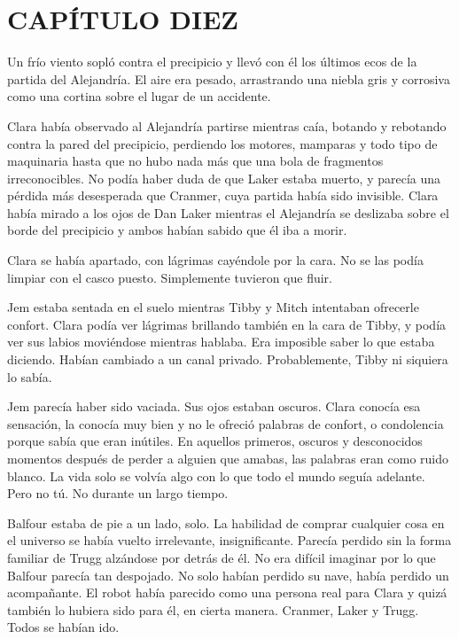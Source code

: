 \chapter*{CAPÍTULO DIEZ}

{Un frío viento sopló contra el precipicio y llevó con él los últimos
 ecos de la partida del Alejandría. El aire era pesado, arrastrando una
 niebla gris y corrosiva como una cortina sobre el lugar de un
accidente.}

{Clara había observado al Alejandría partirse mientras caía, botando y
 rebotando contra la pared del precipicio, perdiendo los motores,
 mamparas y todo tipo de maquinaria hasta que no hubo nada más que una
 bola de fragmentos irreconocibles. No podía haber duda de que Laker
 estaba muerto, y parecía una pérdida más desesperada que Cranmer, cuya
 partida había sido invisible. Clara había mirado a los ojos de Dan Laker
 mientras el Alejandría se deslizaba sobre el borde del precipicio y
ambos habían sabido que él iba a morir.}

{Clara se había apartado, con lágrimas cayéndole por la cara. No se las
podía limpiar con el casco puesto. Simplemente tuvieron que fluir.}

{Jem estaba sentada en el suelo mientras Tibby y Mitch intentaban
 ofrecerle confort. Clara podía ver lágrimas brillando también en la cara
 de Tibby, y podía ver sus labios moviéndose mientras hablaba. Era
 imposible saber lo que estaba diciendo. Habían cambiado a un canal
privado. Probablemente, Tibby ni siquiera lo sabía.}

{Jem parecía haber sido vaciada. Sus ojos estaban oscuros. Clara conocía
 esa sensación, la conocía muy bien y no le ofreció palabras de confort,
 o condolencia porque sabía que eran inútiles. En aquellos primeros,
 oscuros y desconocidos momentos después de perder a alguien que amabas,
 las palabras eran como ruido blanco. La vida solo se volvía algo con lo
 que todo el mundo seguía adelante. Pero no tú. No durante un largo
tiempo.}

{Balfour estaba de pie a un lado, solo. La habilidad de comprar cualquier
 cosa en el universo se había vuelto irrelevante, insignificante. Parecía
 perdido sin la forma familiar de Trugg alzándose por detrás de él. No
 era difícil imaginar por lo que Balfour parecía tan despojado. No solo
 habían perdido su nave, había perdido un acompañante. El robot había
 parecido como una persona real para Clara y quizá también lo hubiera
 sido para él, en cierta manera. Cranmer, Laker y Trugg. Todos se habían
ido.}

